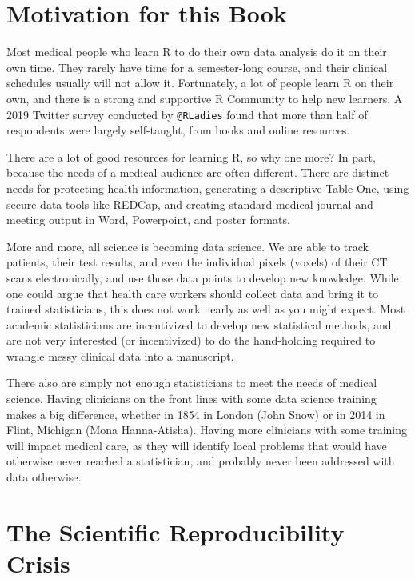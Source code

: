 \documentclass[]{book}
\begin{document}
\hypertarget{motivation-for-this-book}{%
\section{Motivation for this Book}\label{motivation-for-this-book}}

Most medical people who learn R to do their own data analysis do it on their own time. They rarely have time for a semester-long course, and their clinical schedules usually will not allow it. Fortunately, a lot of people learn R on their own, and there is a strong and supportive R Community to help new learners. A 2019 Twitter survey conducted by \texttt{@RLadies} found that more than half of respondents were largely self-taught, from books and online resources.

There are a lot of good resources for learning R, so why one more? In part, because the needs of a medical audience are often different. There are distinct needs for protecting health information, generating a descriptive Table One, using secure data tools like REDCap, and creating standard medical journal and meeting output in Word, Powerpoint, and poster formats.

More and more, all science is becoming data science. We are able to track patients, their test results, and even the individual pixels (voxels) of their CT scans electronically, and use those data points to develop new knowledge. While one could argue that health care workers should collect data and bring it to trained statisticians, this does not work nearly as well as you might expect. Most academic statisticians are incentivized to develop new statistical methods, and are not very interested (or incentivized) to do the hand-holding required to wrangle messy clinical data into a manuscript.

There also are simply not enough statisticians to meet the needs of medical science. Having clinicians on the front lines with some data science training makes a big difference, whether in 1854 in London (John Snow) or in 2014 in Flint, Michigan (Mona Hanna-Atisha). Having more clinicians with some training will impact medical care, as they will identify local problems that would have otherwise never reached a statistician, and probably never been addressed with data otherwise.

\hypertarget{the-scientific-reproducibility-crisis}{%
\section{The Scientific Reproducibility Crisis}\label{the-scientific-reproducibility-crisis}}
\end{document}
